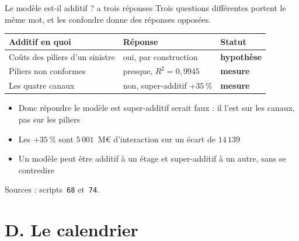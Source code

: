\documentclass[11pt]{beamer}
\begin{document}
\begin{frame}{\og{}Le modèle est-il additif ?\fg{} a trois réponses}
\small
Trois questions différentes portent le même mot, et les confondre donne des réponses opposées.
\vspace{3mm}

\begin{center}\small
\begin{tabular}{@{}l l l@{}}
\toprule
\textbf{Additif en quoi} & \textbf{Réponse} & \textbf{Statut} \\
\midrule
Coûts des piliers d'un sinistre & oui, par construction & \textbf{hypothèse} \\
Piliers non conformes & presque, $R^2 = 0{,}9945$ & \textbf{mesure} \\
Les quatre canaux & non, super-additif $+35\,\%$ & \textbf{mesure} \\
\bottomrule
\end{tabular}
\end{center}
\vspace{4mm}

\begin{itemize}\itemsep6pt
  \item \alert{Donc répondre \og{}le modèle est super-additif\fg{} serait faux} : il l'est sur
        les canaux, pas sur les piliers
  \item Les $+35\,\%$ sont $5\,001$~M\euro{} d'interaction sur un écart de $14\,139$
  \item Un modèle peut être additif à un étage et super-additif à un autre, sans se contredire
\end{itemize}
\vspace{2mm}
{\scriptsize Sources : scripts~\texttt{68} et~\texttt{74}.}
\end{frame}

\section*{D. Le calendrier}
\end{document}
